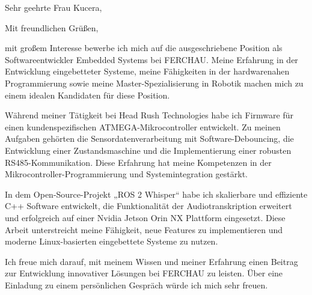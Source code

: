 \documentclass[11pt,a4paper,skipsamekey]{moderncv}
\begin{document}
	\date{\today}
	\opening{Sehr geehrte Frau Kucera,}
	\closing{Mit freundlichen Grüßen,}
	\makelettertitle
	
	mit großem Interesse bewerbe ich mich auf die ausgeschriebene Position als Softwareentwickler Embedded Systems bei FERCHAU. Meine Erfahrung in der Entwicklung eingebetteter Systeme, meine Fähigkeiten in der hardwarenahen Programmierung sowie meine Master-Spezialisierung in Robotik machen mich zu einem idealen Kandidaten für diese Position.
	
	Während meiner Tätigkeit bei Head Rush Technologies habe ich Firmware für einen kundenspezifischen ATMEGA-Mikrocontroller entwickelt. 
	Zu meinen Aufgaben gehörten die Sensordatenverarbeitung mit Software-Debouncing, die Entwicklung einer Zustandsmaschine und die Implementierung einer robusten RS485-Kommunikation. 
	Diese Erfahrung hat meine Kompetenzen in der Mikrocontroller-Programmierung und Systemintegration gestärkt.
	
	In dem Open-Source-Projekt „ROS 2 Whisper“ habe ich skalierbare und effiziente C++ Software entwickelt, die Funktionalität der Audiotranskription erweitert und erfolgreich auf einer Nvidia Jetson Orin NX Plattform eingesetzt. Diese Arbeit unterstreicht meine Fähigkeit, neue Features zu implementieren und moderne Linux-basierten eingebettete Systeme zu nutzen.
	
	Ich freue mich darauf, mit meinem Wissen und meiner Erfahrung einen Beitrag zur Entwicklung innovativer Lösungen bei FERCHAU zu leisten. Über eine Einladung zu einem persönlichen Gespräch würde ich mich sehr freuen.
	
	\vspace{0.5cm}
	\makeletterclosing
	
	
	
	
\end{document}
